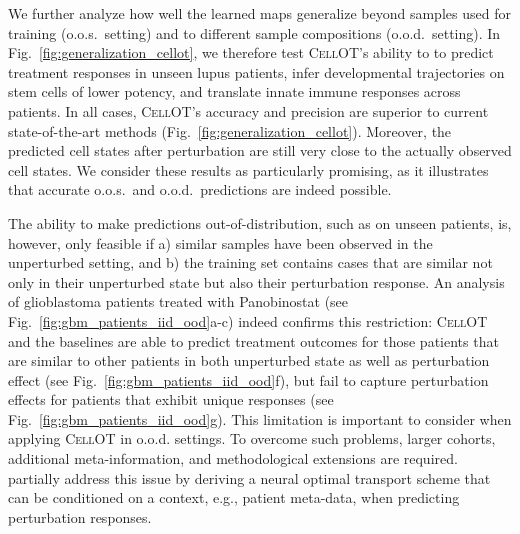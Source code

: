 We further analyze how well the learned maps generalize beyond samples used for training (o.o.s.~setting) and to different sample compositions (o.o.d.~setting). In Fig.~\ref{fig:generalization_cellot}, we therefore test \textsc{CellOT}'s ability to
to predict treatment responses in unseen lupus patients, infer developmental trajectories on stem cells of lower potency, and translate innate immune responses across patients. In all cases, \textsc{CellOT}'s accuracy and precision are superior to current state-of-the-art methods (Fig.~\ref{fig:generalization_cellot}). Moreover, the predicted cell states after perturbation are still very close to the actually observed cell states. We consider these results as particularly promising, as it illustrates that accurate o.o.s.~and o.o.d.~predictions are indeed possible.

\smallskip

The ability to make predictions out-of-distribution, such as on unseen patients, is, however, only feasible if a) similar samples have been observed in the unperturbed setting, and b) the training set contains cases that are similar not only in their unperturbed state but also their perturbation response.
An analysis of glioblastoma patients treated with Panobinostat \citep{zhao2021deconvolution} (see Fig.~\ref{fig:gbm_patients_iid_ood}a-c) indeed confirms this restriction:
\textsc{CellOT} and the baselines are able to predict treatment outcomes for those patients that are similar to other patients in both unperturbed state as well as perturbation effect (see Fig.~\ref{fig:gbm_patients_iid_ood}f), but fail to capture perturbation effects for patients that exhibit unique responses (see Fig.~\ref{fig:gbm_patients_iid_ood}g).
This limitation is important to consider when applying \textsc{CellOT} in o.o.d. settings. To overcome such problems, 
larger cohorts, additional meta-information, and methodological extensions are required. \citet{bunne2022supervised} partially address this issue by deriving a neural optimal transport scheme that can be conditioned on a context, e.g., patient meta-data, when predicting perturbation responses.

